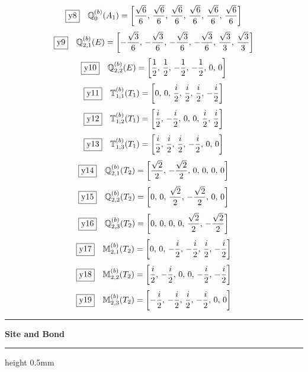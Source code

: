 \documentclass[fleqn,10pt,landscape]{jsarticle}
\begin{document}
\begin{dmath*}
\fbox{y8}\quad \mathbb{Q}_{0}^{(b)}(A_{1})=\left[ \frac{\sqrt{6}}{6},\, \frac{\sqrt{6}}{6},\, \frac{\sqrt{6}}{6},\, \frac{\sqrt{6}}{6},\, \frac{\sqrt{6}}{6},\, \frac{\sqrt{6}}{6} \right]
\end{dmath*}
\begin{dmath*}
\fbox{y9}\quad \mathbb{Q}_{2,1}^{(b)}(E)=\left[ - \frac{\sqrt{3}}{6},\, - \frac{\sqrt{3}}{6},\, - \frac{\sqrt{3}}{6},\, - \frac{\sqrt{3}}{6},\, \frac{\sqrt{3}}{3},\, \frac{\sqrt{3}}{3} \right]
\end{dmath*}
\begin{dmath*}
\fbox{y10}\quad \mathbb{Q}_{2,2}^{(b)}(E)=\left[ \frac{1}{2},\, \frac{1}{2},\, - \frac{1}{2},\, - \frac{1}{2},\, 0,\, 0 \right]
\end{dmath*}
\begin{dmath*}
\fbox{y11}\quad \mathbb{T}_{1,1}^{(b)}(T_{1})=\left[ 0,\, 0,\, \frac{i}{2},\, \frac{i}{2},\, \frac{i}{2},\, - \frac{i}{2} \right]
\end{dmath*}
\begin{dmath*}
\fbox{y12}\quad \mathbb{T}_{1,2}^{(b)}(T_{1})=\left[ \frac{i}{2},\, - \frac{i}{2},\, 0,\, 0,\, \frac{i}{2},\, \frac{i}{2} \right]
\end{dmath*}
\begin{dmath*}
\fbox{y13}\quad \mathbb{T}_{1,3}^{(b)}(T_{1})=\left[ \frac{i}{2},\, \frac{i}{2},\, \frac{i}{2},\, - \frac{i}{2},\, 0,\, 0 \right]
\end{dmath*}
\begin{dmath*}
\fbox{y14}\quad \mathbb{Q}_{2,1}^{(b)}(T_{2})=\left[ \frac{\sqrt{2}}{2},\, - \frac{\sqrt{2}}{2},\, 0,\, 0,\, 0,\, 0 \right]
\end{dmath*}
\begin{dmath*}
\fbox{y15}\quad \mathbb{Q}_{2,2}^{(b)}(T_{2})=\left[ 0,\, 0,\, \frac{\sqrt{2}}{2},\, - \frac{\sqrt{2}}{2},\, 0,\, 0 \right]
\end{dmath*}
\begin{dmath*}
\fbox{y16}\quad \mathbb{Q}_{2,3}^{(b)}(T_{2})=\left[ 0,\, 0,\, 0,\, 0,\, \frac{\sqrt{2}}{2},\, - \frac{\sqrt{2}}{2} \right]
\end{dmath*}
\begin{dmath*}
\fbox{y17}\quad \mathbb{M}_{2,1}^{(b)}(T_{2})=\left[ 0,\, 0,\, - \frac{i}{2},\, - \frac{i}{2},\, \frac{i}{2},\, - \frac{i}{2} \right]
\end{dmath*}
\begin{dmath*}
\fbox{y18}\quad \mathbb{M}_{2,2}^{(b)}(T_{2})=\left[ \frac{i}{2},\, - \frac{i}{2},\, 0,\, 0,\, - \frac{i}{2},\, - \frac{i}{2} \right]
\end{dmath*}
\begin{dmath*}
\fbox{y19}\quad \mathbb{M}_{2,3}^{(b)}(T_{2})=\left[ - \frac{i}{2},\, - \frac{i}{2},\, \frac{i}{2},\, - \frac{i}{2},\, 0,\, 0 \right]
\end{dmath*}
\vspace{5mm}
\noindent \rule[0.5mm]{5mm}{0.5mm}\hspace{3mm}\textbf{Site and Bond}\hspace{3mm}\leaders\hrule height 0.5mm\hfill\kern0pt
\vspace{3mm}
\end{document}
